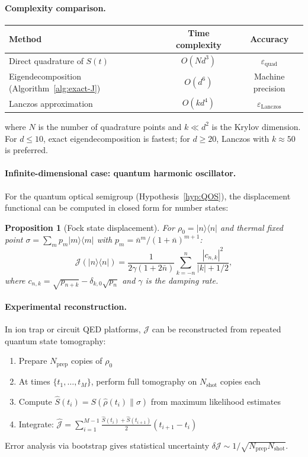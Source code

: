 \documentclass[11pt,a4paper]{article}
\newtheorem{proposition}[theorem]{Proposition}
\theoremstyle{definition}
\theoremstyle{remark}
\begin{document}
\paragraph{Complexity comparison.}
\begin{center}
\begin{tabular}{@{}lcc@{}}
\toprule
Method & Time complexity & Accuracy \\
\midrule
Direct quadrature of $S(t)$ & $O(Nd^3)$ & $\varepsilon_{\mathrm{quad}}$ \\
Eigendecomposition (Algorithm~\ref{alg:exact-J}) & $O(d^6)$ & Machine precision \\
Lanczos approximation & $O(kd^4)$ & $\varepsilon_{\mathrm{Lanczos}}$ \\
\bottomrule
\end{tabular}
\end{center}
where $N$ is the number of quadrature points and $k \ll d^2$ is the Krylov 
dimension. For $d \le 10$, exact eigendecomposition is fastest; for 
$d \ge 20$, Lanczos with $k \approx 50$ is preferred.

\paragraph{Infinite-dimensional case: quantum harmonic oscillator.}
For the quantum optical semigroup (Hypothesis~\ref{hyp:QOS}), the 
displacement functional can be computed in closed form for number states:

\begin{proposition}[Fock state displacement]
For $\rho_0 = |n\rangle\!\langle n|$ and thermal fixed point 
$\sigma = \sum_{m} p_m|m\rangle\!\langle m|$ with 
$p_m = \bar{n}^m/(1+\bar{n})^{m+1}$:
\begin{equation}
  \mathcal{J}(|n\rangle\!\langle n|) 
  = \frac{1}{2\gamma(1+2\bar{n})} 
  \sum_{k=-n}^{n} \frac{|c_{n,k}|^2}{|k| + 1/2},
\end{equation}
where $c_{n,k} = \sqrt{p_{n+k}} - \delta_{k,0}\sqrt{p_n}$ and 
$\gamma$ is the damping rate.
\end{proposition}

\paragraph{Experimental reconstruction.}
In ion trap or circuit QED platforms, $\mathcal{J}$ can be reconstructed 
from repeated quantum state tomography:
\begin{enumerate}[label=(\roman*)]
  \item Prepare $N_{\mathrm{prep}}$ copies of $\rho_0$
  \item At times $\{t_1, \ldots, t_M\}$, perform full tomography on 
     $N_{\mathrm{shot}}$ copies each
  \item Compute $\hat{S}(t_i) = S(\hat\rho(t_i)\|\sigma)$ from maximum 
     likelihood estimates
  \item Integrate: $\hat{\mathcal{J}} = \sum_{i=1}^{M-1} 
     \frac{\hat{S}(t_i) + \hat{S}(t_{i+1})}{2}(t_{i+1}-t_i)$
\end{enumerate}
Error analysis via bootstrap gives statistical uncertainty 
$\delta\mathcal{J} \sim 1/\sqrt{N_{\mathrm{prep}} N_{\mathrm{shot}}}$.
\end{document}
